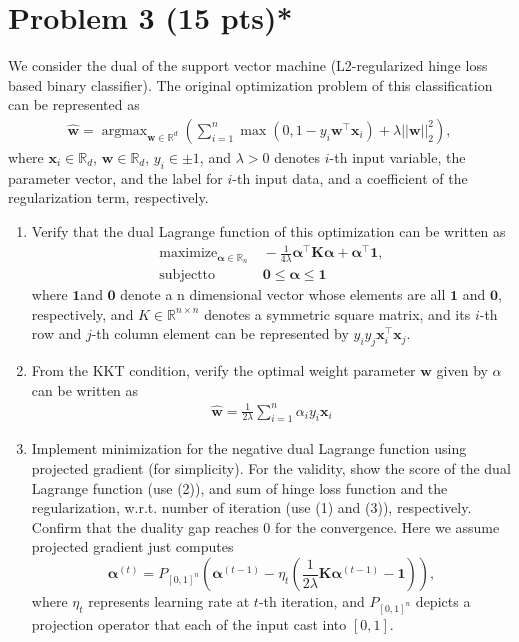 \documentclass{jsarticle}
\DeclareMathOperator*{\argmax}{argmax}
\begin{document}
\section*{Problem 3 (15 pts)*}
We consider the dual of the support vector machine (L2-regularized hinge loss based binary classifier). The original optimization problem of this classification can be represented as
\begin{align}
  \hat{\bm w} = \argmax_{\bm w\in \mathbb R^d}\left(\sum_{i=1}^n\max(0, 1 − y_i\bm w^\top \bm x_i) + \lambda||\bm w||_2^2\right),
\end{align}
where $\bm x_i \in \mathbb R_d$, $\bm w \in \mathbb R_d$, $y_i \in {±1}$, and $\lambda > 0$ denotes $i$-th input variable, the parameter vector, and the label for $i$-th input data, and a coefficient of the regularization term, respectively.
\begin{enumerate}
  \item Verify that the dual Lagrange function of this optimization can be written as
  \begin{align}
    \nonumber
    \mathrm{maximize}_{ \bm\alpha\in\mathbb R_n}&\ − \frac{1}{4\lambda} \bm\alpha^\top\bm K\bm\alpha + \bm\alpha^\top\bm 1,  \\
    \mathrm{subject to}&\ \bm 0\le\bm\alpha\le\bm 1
  \end{align}
  where $\bm 1$and $\bm 0$ denote a n dimensional vector whose elements are all $\bm 1$ and $\bm 0$, respectively, and $K \in \mathbb R^{n×n}$ denotes a symmetric square matrix, and its $i$-th row and $j$-th column element can be represented by $y_iy_j\bm x_i^\top\bm x_j$.
  \item From the KKT condition, verify the optimal weight parameter $\bm w$ given by $\alpha$ can be written as
  \begin{align}
    \hat{\bm w} = \frac{1}{2\lambda}\sum_{i=1}^n \alpha_iy_i\bm x_i
  \end{align}
  \item Implement minimization for the negative dual Lagrange function using projected gradient (for simplicity). For the validity, show the score of the dual Lagrange function (use (2)), and sum of hinge loss function and the regularization, w.r.t. number of iteration (use (1) and (3)), respectively. Confirm that the duality gap reaches 0 for the convergence. Here we assume projected gradient just computes
  $$
  \bm\alpha^{(t)} = P_{[0,1]^n} \left(\bm\alpha^{(t−1)} − \eta_t\left(\frac{1}{2\lambda}\bm K\bm\alpha^{(t−1)} − \bm 1\right)\right),
  $$
  where $\eta_t$ represents learning rate at $t$-th iteration, and $P_{[0,1]^n}$ depicts a projection operator that each of the input cast into $[0, 1]$.
\end{enumerate}
\end{document}
